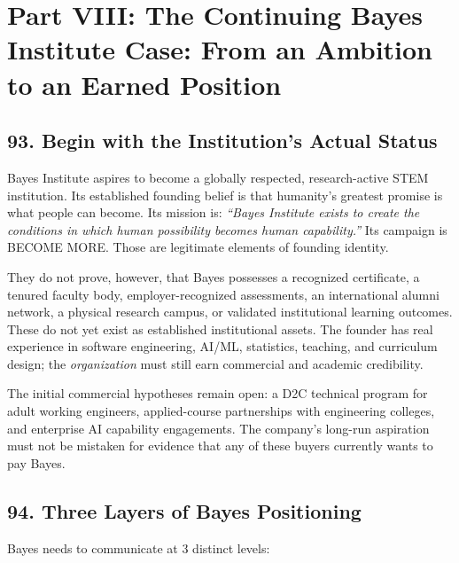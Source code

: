 \section*{Part VIII: The Continuing Bayes Institute Case: From an Ambition to an Earned Position}

\subsection*{93. Begin with the Institution's Actual Status}

Bayes Institute aspires to become a globally respected, research-active STEM institution. Its established founding belief is that humanity's greatest promise is what people can become. Its mission is: \emph{``Bayes Institute exists to create the conditions in which human possibility becomes human capability.''} Its campaign is \textsf{BECOME MORE.} Those are legitimate elements of founding identity.

They do not prove, however, that Bayes possesses a recognized certificate, a tenured faculty body, employer-recognized assessments, an international alumni network, a physical research campus, or validated institutional learning outcomes. These do not yet exist as established institutional assets. The founder has real experience in software engineering, AI/ML, statistics, teaching, and curriculum design; the \emph{organization} must still earn commercial and academic credibility.

The initial commercial hypotheses remain open: a D2C technical program for adult working engineers, applied-course partnerships with engineering colleges, and enterprise AI capability engagements. The company's long-run aspiration must not be mistaken for evidence that any of these buyers currently wants to pay Bayes.

\subsection*{94. Three Layers of Bayes Positioning}

Bayes needs to communicate at 3 distinct levels:

